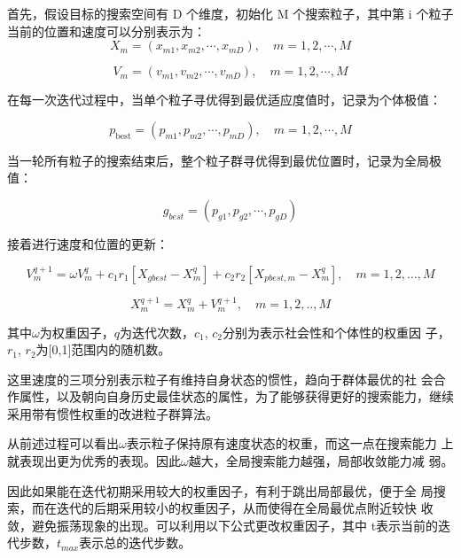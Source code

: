 \documentclass[withoutpreface,bwprint]{cumcmthesis} %
\begin{document}
首先，假设目标的搜索空间有 D 个维度，初始化 M 个搜索粒子，其中第 i 个粒子当前的位置和速度可以分别表示为：
\begin{equation}
	X_{m}=\left(x_{m 1}, x_{m 2}, \cdots, x_{m D}\right), \quad m=1,2, \cdots, M
\end{equation}


\begin{equation}
	V_{m}=\left(v_{m 1}, v_{m 2}, \cdots, v_{m D}\right), \quad m=1,2, \cdots, M
\end{equation}

在每一次迭代过程中，当单个粒子寻优得到最优适应度值时，记录为个体极值：

\begin{equation}
	p_{\text {best}}=\left(p_{m 1}, p_{m 2}, \cdots, p_{m D}\right), \quad m=1,2, \cdots, M
\end{equation}

当一轮所有粒子的搜索结束后，整个粒子群寻优得到最优位置时，记录为全局极值：

\begin{equation}
	g_{b e s t}=\left(p_{g 1}, p_{g 2}, \cdots, p_{g D}\right)
\end{equation}

接着进行速度和位置的更新：

\begin{equation}
V_{m}^{q+1}=\omega V_{m}^{q}+c_{1} r_{1}\left[X_{g b e s t}-X_{m}^{q}\right]+c_{2} r_{2}\left[X_{p b e s t, m}-X_{m}^{q}\right], \quad m=1,2, \ldots, M
\end{equation}

\begin{equation}
X_{m}^{q+1}=X_{m}^{q}+V_{m}^{q+1}, \quad m=1,2, . ., M
\end{equation}


其中$\omega$为权重因子，$q$为迭代次数，$c_1$, $c_2$分别为表示社会性和个体性的权重因
子，$r_1$, $r_2$为[0,1]范围内的随机数。

这里速度的三项分别表示粒子有维持自身状态的惯性，趋向于群体最优的社
会合作属性，以及朝向自身历史最佳状态的属性，为了能够获得更好的搜索能力，继续采用带有惯性权重的改进粒子群算法。

从前述过程可以看出$\omega$表示粒子保持原有速度状态的权重，而这一点在搜索能力
上就表现出更为优秀的表现。因此$\omega$越大，全局搜索能力越强，局部收敛能力减
弱。

因此如果能在迭代初期采用较大的权重因子，有利于跳出局部最优，便于全
局搜索，而在迭代的后期采用较小的权重因子，从而使得在全局最优点附近较快
收敛，避免振荡现象的出现。可以利用以下公式更改权重因子，其中 t表示当前的迭代步数，$t_{max}$表示总的迭代步数。
\end{document}
